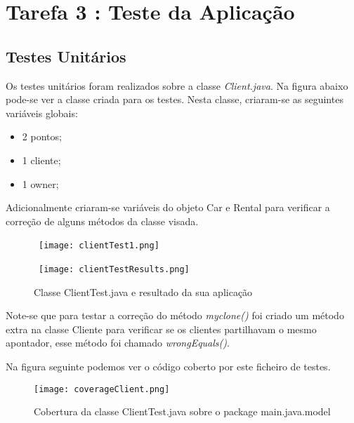 \section{Tarefa 3 : Teste da Aplicação}

\subsection{Testes Unitários}

\par Os testes unitários foram realizados sobre a classe \textit{Client.java}.
Na figura abaixo pode-se ver a classe criada para os testes.\newline
Nesta classe, criaram-se as seguintes variáveis globais:
\begin{itemize}
\item 2 pontos;
\item 1 cliente;
\item 1 owner;
\end{itemize}

\par Adicionalmente criaram-se variáveis do objeto Car e Rental para verificar a correção de alguns métodos da classe visada.

\begin{figure}[H]

  \centering

  \hbox{\hspace{-6em} \texttt{[image: clientTest1.png]}}

\end{figure}

\begin{figure}[H]

  \centering

  \hbox{\hspace{-8em} \texttt{[image: clientTestResults.png]}}

  \caption {Classe ClientTest.java e resultado da sua aplicação}

  \label {fig30}

\end{figure}
\par Note-se que para testar a correção do método \textit{myclone()} foi criado um método extra na classe Cliente para verificar se os clientes partilhavam o mesmo apontador, esse método foi chamado \textit{wrongEquals()}.

\par Na figura seguinte podemos ver o código coberto por este ficheiro de testes.\newline
\newpage
\begin{figure}[H]

  \centering

  \texttt{[image: coverageClient.png]}

  \caption {Cobertura da classe ClientTest.java sobre o package main.java.model}

  \label {fig31}

\end{figure}

